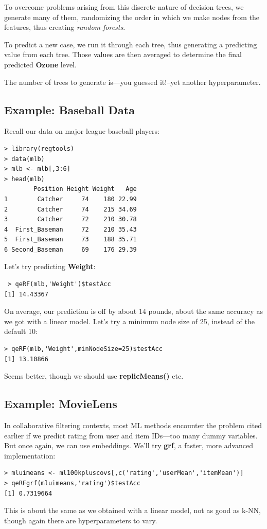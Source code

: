 To overcome problems arising from this discrete nature of decision
trees, we generate many of them, randomizing the order in which we make
nodes from the features, thus creating \textit{random forests}.

To predict a new case, we run it through each tree, thus generating a
predicting value from each tree.  Those values are then averaged to
determine the final predicted \textbf{Ozone} level.

The number of trees to generate is---you guessed it!--yet another
hyperparameter.

\subsection{Example:  Baseball Data}

Recall our data on major league baseball players:

\begin{lstlisting}
> library(regtools)
> data(mlb)
> mlb <- mlb[,3:6]
> head(mlb)
        Position Height Weight   Age
1        Catcher     74    180 22.99
2        Catcher     74    215 34.69
3        Catcher     72    210 30.78
4  First_Baseman     72    210 35.43
5  First_Baseman     73    188 35.71
6 Second_Baseman     69    176 29.39
\end{lstlisting}

Let's try predicting \textbf{Weight}:

\begin{lstlisting} > qeRF(mlb,'Weight')$testAcc
[1] 14.43367
\end{lstlisting}

On average, our prediction is off by about 14 pounds, about the same
accuracy as we got with a linear model.  Let's try a minimum node size
of 25, instead of the default 10:

\begin{lstlisting}
> qeRF(mlb,'Weight',minNodeSize=25)$testAcc
[1] 13.10866
\end{lstlisting}

Seems better, though we should use \textbf{replicMeans()} etc.

\subsection{Example:  MovieLens}

In collaborative filtering contexts, most ML methods encounter the 
problem cited earlier if we predict rating from user and item IDs---too 
many dummy variables.  But once again, we can use embeddings.  We'll try
\textbf{grf}, a faster, more advanced implementation:

\begin{lstlisting}
> mluimeans <- ml100kpluscovs[,c('rating','userMean','itemMean')]
> qeRFgrf(mluimeans,'rating')$testAcc
[1] 0.7319664
\end{lstlisting}

This is about the same as we obtained with a linear model, not as good
as k-NN, though again there are hyperparameters to vary.
